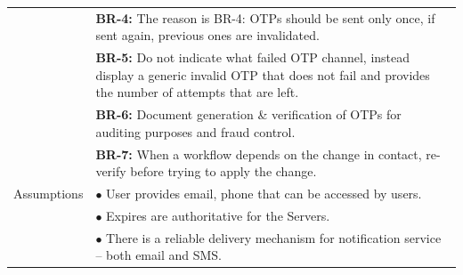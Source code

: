 \begin{longtable}{|>{\raggedright\arraybackslash}p{4cm}|>{\raggedright\arraybackslash}p{11cm}|}
& \textbf{BR-4:} The reason is BR-4: OTPs should be sent only once, if sent again, previous ones are invalidated. \\
& \textbf{BR-5:} Do not indicate what failed OTP channel, instead display a generic invalid OTP that does not fail and provides the number of attempts that are left. \\
& \textbf{BR-6:} Document generation \& verification of OTPs for auditing purposes and fraud control. \\
& \textbf{BR-7:} When a workflow depends on the change in contact, re-verify before trying to apply the change. \\
\hline
Assumptions & $\bullet$ User provides email, phone that can be accessed by users. \\
& $\bullet$ Expires are authoritative for the Servers. \\
& $\bullet$ There is a reliable delivery mechanism for notification service – both email and SMS. \\
\end{longtable}

